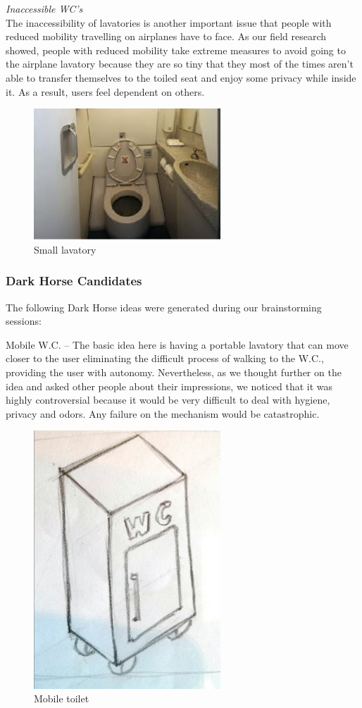 \emph{Inaccessible WC’s}\\
 The inaccessibility of lavatories is another important issue that people with reduced mobility travelling on airplanes have to face. As our field research showed, people with reduced mobility take extreme measures to avoid going to the airplane lavatory because they are so tiny that they most of the times aren’t able to transfer themselves to the toiled seat and enjoy some privacy while inside it. As a result, users feel dependent on others.\\

\begin{figure}[h]
\centering
\includegraphics[width=7cm]{brazil_images/image003.png}
\caption{Small lavatory}
\label{fig:small_lavatory}
\end{figure}

\subsubsection{Dark Horse Candidates}
The following Dark Horse ideas were generated during our brainstorming sessions:

Mobile W.C. – The basic idea here is having a portable lavatory that can move closer to the user eliminating the difficult process of walking to the W.C., providing the user with autonomy. Nevertheless, as we thought further on the idea and asked other people about their impressions, we noticed that it was highly controversial because it would be very difficult to deal with hygiene, privacy and odors. Any failure on the mechanism would be catastrophic.

\begin{figure}[h]
\centering
\includegraphics[width=7cm]{brazil_images/image005.png}
\caption{Mobile toilet}
\label{fig:mobile_toilet}
\end{figure}

